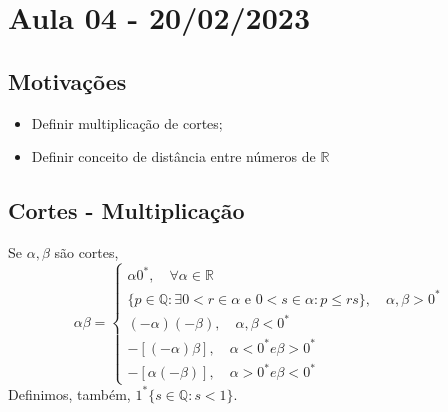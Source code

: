 \documentclass[Analysis/analysis_notes.tex]{subfiles}
\begin{document}
\section{Aula 04 - 20/02/2023}
\subsection{Motiva\c c\~oes}
\begin{itemize}
	\item Definir multiplica\c c\~ao de cortes;
	\item Definir conceito de dist\^ancia entre n\'umeros de $\mathbb{R}$
\end{itemize}
\subsection{Cortes - Multiplica\c c\~ao}
\begin{def*}
	Se $\alpha, \beta$ s\~ao cortes,
	$$
		\alpha\beta = \left\{\begin{array}{ll}
			\alpha0^*, \quad\forall \alpha\in \mathbb{R}                                                            \\
			\{p\in\mathbb{Q}: \exists0 < r\in\alpha \text{ e }0 < s\in\alpha: p \leq rs\},\quad \alpha, \beta > 0^* \\
			(-\alpha)(-\beta), \quad \alpha, \beta < 0^*                                                            \\
			-[(-\alpha)\beta], \quad \alpha < 0^* e \beta > 0^*                                                     \\
			-[\alpha(-\beta)], \quad \alpha > 0^* e \beta < 0^*
		\end{array}\right.
	$$
	Definimos, tamb\'em, $1^*\{s\in\mathbb{Q}: s < 1\}$.
\end{def*}
\newpage
\end{document}
